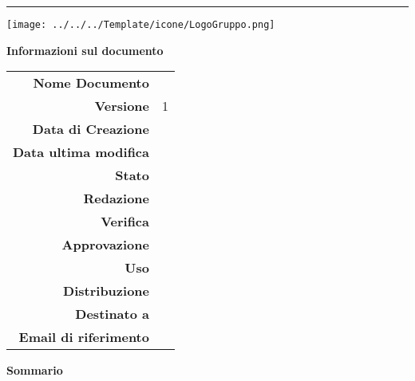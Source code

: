 \begin{center}

\begin{large} \textbf{\gruppoLink} \end{large}
\vspace{0.2em}

\hrule
\vspace{3em}

\texttt{[image: ../../../Template/icone/LogoGruppo.png]}

\thispagestyle{empty}

\vfill

\begin{center} 
  \begin{Huge}
  {\fontsize{15mm}{20mm}\selectfont \progetto} 
  \end{Huge}
\end{center}

\begin{Huge} \documento \end{Huge}

\begin{center}
\textbf{Informazioni sul documento} \\ \vspace{2em}
\small
\begin{tabular}{r|l}
	\textbf{Nome Documento} & \nomedocumentofisico \\
	\textbf{Versione}	& 1\\
	\textbf{Data di Creazione} & \datacreazione\\
	\textbf{Data ultima modifica} & \datamodifica\\
	\textbf{Stato} & \stato \\
	\textbf{Redazione}	& \redazione\\
	\textbf{Verifica}	& \verifica\\
	\textbf{Approvazione}	& \approvazione\\
	\textbf{Uso}  & \uso\\
	\textbf{Distribuzione} & \gruppo \\
	\textbf{Destinato a}  &  \destinateTo \\
	\textbf{Email di riferimento} & \email
\end{tabular}
\end{center}

\normalsize
\textbf{Sommario\\} 

\end{center}
\clearpage
